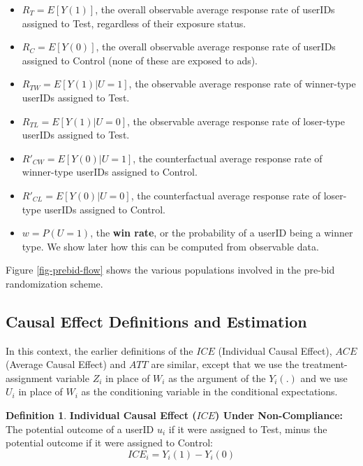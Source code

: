 \documentclass[11pt,a4paper]{article}
\theoremstyle{definition}
\newtheorem{definition}{Definition}[section]
\theoremstyle{remark}
\theoremstyle{definition}
\theoremstyle{definition}
\theoremstyle{definition}
\theoremstyle{definition}
\theoremstyle{definition}
\theoremstyle{definition}
\begin{document}
\begin{itemize}
	\item $R_T = E[Y(1)]$, the overall observable average response rate of userIDs assigned to Test, regardless of their exposure status.
	\item $R_C = E[Y(0)]$, the overall observable average response rate of userIDs assigned to Control (none of these are exposed to ads).
	\item $R_{TW} = E[Y(1) | U=1]$, the observable average response rate of winner-type userIDs assigned to Test.
	\item $R_{TL} = E[Y(1) | U=0]$, the observable average response rate of loser-type userIDs assigned to Test.
	\item $R'_{CW} = E[Y(0) | U=1]$, the counterfactual average response rate of winner-type userIDs assigned to Control.
	\item $R'_{CL} = E[Y(0) | U=0]$, the counterfactual average response rate of loser-type userIDs assigned to Control.
	\item $w = P(U=1)$, the \textbf{win rate}, or the probability of a userID being a winner type. We show later how this can be computed from observable data.
\end{itemize}

Figure \ref{fig-prebid-flow} shows the various populations involved in the pre-bid randomization scheme.

\subsection{Causal Effect Definitions and Estimation}\label{sec-causal-est}

In this context, the earlier definitions of the $ICE$ (Individual Causal Effect), $ACE$ (Average Causal Effect) and $ATT$ are similar, except that we use the treatment-assignment variable $Z_i$ in place of $W_i$ as the argument of the $Y_i(.)$ and we use $U_i$ in place of $W_i$ as the conditioning variable in the conditional expectations.

\begin{definition}\label{def-ice-noncomp}
	\textbf{Individual Causal Effect ($ICE$) Under Non-Compliance:} The potential outcome of a userID $u_i$ if it were assigned to Test, minus the potential outcome if it were assigned to Control:
\begin{equation}
ICE_i = Y_i(1) - Y_i(0) \label{eq-ice-noncomp}	
\end{equation}
\end{definition}
\end{document}
